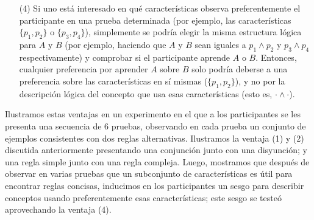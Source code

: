 \begin{enumerate}
\item [(4)] 
Si uno está interesado en qué características observa preferentemente el participante en una prueba determinada (por ejemplo, las características $\{p_1, p_2 \}$ o $\{p_3, p_4 \} $), simplemente se podría elegir la misma estructura lógica para $A$ y $B$ (por ejemplo, haciendo que $A$ y $B$ sean iguales a $p_1 \land p_2$ y $p_3 \land p_4 $ respectivamente) y comprobar si el participante aprende $A$ o $B$. Entonces, cualquier preferencia por aprender $A$ sobre $B$ solo podría deberse a una preferencia sobre las características en sí mismas ($\{p_1, p_2 \} $), y no por la descripción lógica del concepto que usa esas características (esto es, $\boldsymbol{\cdot} \land \boldsymbol{\cdot}$).
\end{enumerate}



Ilustramos estas ventajas en un experimento en el que a los participantes se les presenta una secuencia de 6 pruebas, observando en cada prueba un conjunto de ejemplos consistentes con dos reglas alternativas. Ilustramos la ventaja (1) y (2) discutida anteriormente presentando una conjunción junto con una disyunción; y una regla simple junto con una regla compleja. Luego, mostramos que después de observar en varias pruebas que un subconjunto de características es útil para encontrar reglas concisas, inducimos en los participantes un sesgo para describir conceptos usando preferentemente esas características; este sesgo se testeó aprovechando la ventaja (4).






